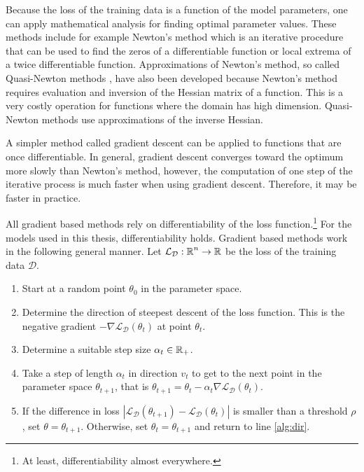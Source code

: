 Because the loss of the training data is a function of the model
parameters, one can apply mathematical analysis for finding optimal
parameter values. These methods include for example Newton's method
which is an iterative procedure that can be used to find the zeros of
a differentiable function or local extrema of a twice differentiable
function. Approximations of Newton's method, so called Quasi-Newton
methods \citep{Liu1989}, have also been developed because Newton's
method requires evaluation and inversion of the Hessian matrix of a
function. This is a very costly operation for functions where the
domain has high dimension. Quasi-Newton methods use approximations of
the inverse Hessian.

A simpler method called gradient descent can be applied to functions
that are once differentiable. In
general, gradient descent converges toward the optimum more slowly
than Newton's method, however, the computation of one step of the
iterative process is much faster when using gradient
descent. Therefore, it may be faster in practice.

All gradient based methods rely on differentiability of the loss
function.\footnote{At least, differentiability almost everywhere.} For
the models used in this thesis, differentiability holds. Gradient
based methods work in the following general manner. Let
$\mathcal{L}_{\mathcal{D}}:\mbox{$\mathbb R$}^n \rightarrow \mbox{$\mathbb R$}$ be the loss of the training data
$\mathcal{D}$.

\begin{enumerate}
\item Start at a random point $\theta_0$ in the parameter space.
\item Determine the direction of steepest descent of the loss
function. This is the negative gradient $-\nabla
\mathcal{L}_{\mathcal{D}}(\theta_t)$ at point $\theta_t$.\label{alg:dir}
\item Determine a suitable step size $\alpha_t \in \mbox{$\mathbb R$}_+$.
\item Take a step of length $\alpha_t$ in direction $v_t$ to get to
the next point in the parameter space $\theta_{t+1}$, that is
$\theta_{t+1} = \theta_t - \alpha_t \nabla \mathcal{L}_{\mathcal{D}}(\theta_t)$.
\item If the difference in loss $|\mathcal{L}_{\mathcal{D}}(\theta_{t+1}) -
\mathcal{L}_{\mathcal{D}}(\theta_t)|$ is smaller than a threshold $\rho$, set
$\theta = \theta_{t+1}$. Otherwise, set $\theta_t = \theta_{t+1}$ and
return to line \ref{alg:dir}.
\end{enumerate}

